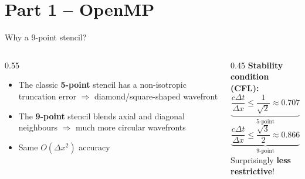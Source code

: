 \documentclass[11pt,aspectratio=169]{beamer}
\begin{document}
\section{Part 1 -- OpenMP}

\begin{frame}{Why a 9-point stencil?}
  \begin{columns}
    \begin{column}{0.55\textwidth}
      \begin{itemize}
        \item The classic \textbf{5-point} stencil has a non-isotropic
          truncation error $\Rightarrow$ diamond/square-shaped wavefront
        \item The \textbf{9-point} stencil blends axial and diagonal
          neighbours $\Rightarrow$ much more circular wavefronts
        \item Same $O(\Delta x^2)$ accuracy
      \end{itemize}
    \end{column}
    \begin{column}{0.45\textwidth}
      \textbf{Stability condition (CFL):}
      \[
        \underbrace{\frac{c\Delta t}{\Delta x} \le \frac{1}{\sqrt{2}}
        \approx 0.707}_{\text{5-point}}
      \]
      \[
        \underbrace{\frac{c\Delta t}{\Delta x} \le \frac{\sqrt{3}}{2}
        \approx 0.866}_{\text{9-point}}
      \]
      Surprisingly \textbf{less restrictive}!
    \end{column}
  \end{columns}
\end{frame}
\end{document}
